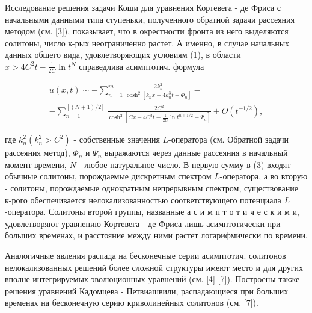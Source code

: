 \documentclass[10pt]{article}
\begin{document}
Исследование решения задачи Коши для уравнения Кортевега - де Фриса с начальными данными типа ступеньки, полученного обратной задачи рассеяния методом (см. [3]), показывает, что в окрестности фронта из него выделяются солитоны, число к-рых неограниченно растет. А именно, в случае начальных данных общего вида, удовлетворяющих условиям (1), в области $x>4 C^{2} t-\frac{1}{2 C} \ln t^{N}$ справедлива асимптотич. формула



\[

\begin{gathered}

u(x, t) \sim-\sum_{n=1}^{m} \frac{2 k_{n}^{2}}{\cosh ^{2}\left[k_{n} x-4 k_{n}^{3} t+\Phi_{n}\right]}- \\

-\sum_{n=1}^{[(N+1) / 2]} \frac{2 C^{2}}{\cosh ^{2}\left[C x-4 C^{3} t-\frac{1}{2 C} \ln t^{n+1 / 2}+\Psi_{n}\right]}+O\left(t^{-1 / 2}\right),

\end{gathered}

\]



где $k_{n}^{2}\left(k_{n}^{2}>C^{2}\right)$ - собственные значения $L$-оператора (см. Обратной задачи рассеяния метод), $\Phi_{n}$ и $\Psi_{n}$ выражаются через данные рассеяния в начальный момент времени, $N$ - любое натуральное число. В первую сумму в (3) входят обычные солитоны, порождаемые дискретным спектром $L$-оператора, а во вторую - солитоны, порождаемые однократным непрерывным спектром, существование к-рого обеспечивается нелокализованностью соответствующего потенциала $L$-оператора. Солитоны второй группы, названные а с и м п т о т и ч е с к и м и, удовлетворяют уравнению Кортевега - де Фриса лишь асимптотически при больших временах, и расстояние между ними растет логарифмически по времени.



Аналогичные явления распада на бесконечные серии асимптотич. солитонов нелокализованных решений более сложной структуры имеют место и для других вполне интегрируемых эволюционных уравнений (см. [4]-[7]). Построены также решения уравнений Кадомцева - Петвиашвили, распадающиеся при больших временах на бесконечную серию криволинейных солитонов (см. [7]).
\end{document}
